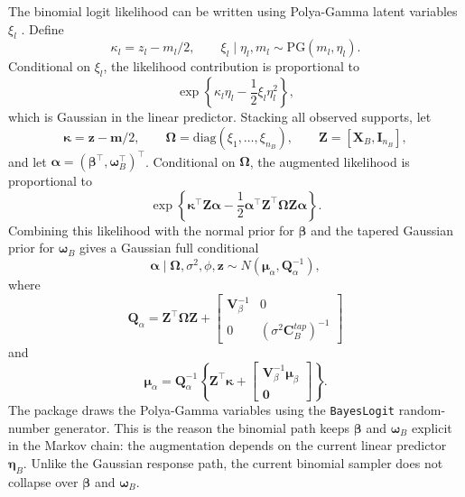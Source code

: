 \documentclass[11pt]{article}
\newcommand{\bbeta}{\bm{\beta}}
\newcommand{\bw}{\bm{\omega}}
\newcommand{\bzero}{\bm{0}}
\newcommand{\bI}{\bm{I}}
\newcommand{\bC}{\bm{C}}
\newcommand{\bV}{\bm{V}}
\newcommand{\bQ}{\bm{Q}}
\newcommand{\bX}{\bm{X}}
\newcommand{\bZ}{\bm{Z}}
\newcommand{\bz}{\bm{z}}
\newcommand{\bOmega}{\bm{\Omega}}
\newcommand{\trans}{^\top}
\begin{document}
The binomial logit likelihood can be written using Polya-Gamma latent
variables \(\xi_l\) \citep{PolsonScottWindle2013}. Define
\begin{equation}
  \kappa_l = z_l - m_l/2,
  \qquad
  \xi_l\mid \eta_l,m_l \sim \mathrm{PG}(m_l,\eta_l).
\end{equation}
Conditional on \(\xi_l\), the likelihood contribution is proportional to
\begin{equation}
  \exp\left\{\kappa_l\eta_l-\frac{1}{2}\xi_l\eta_l^2\right\},
\end{equation}
which is Gaussian in the linear predictor. Stacking all observed supports,
let
\[
  \bm{\kappa}=\bz-\bm{m}/2,
  \qquad
  \bOmega = \mathrm{diag}(\xi_1,\ldots,\xi_{n_B}),
  \qquad
  \bZ=[\bX_B,\bI_{n_B}],
\]
and let \(\bm{\alpha}=(\bbeta\trans,\bw_B\trans)\trans\). Conditional on
\(\bOmega\), the augmented likelihood is proportional to
\begin{equation}
  \exp\left\{
    \bm{\kappa}\trans\bZ\bm{\alpha}
    -\frac{1}{2}\bm{\alpha}\trans\bZ\trans\bOmega\bZ\bm{\alpha}
  \right\}.
\end{equation}
Combining this likelihood with the normal prior for \(\bbeta\) and the
tapered Gaussian prior for \(\bw_B\) gives a Gaussian full conditional
\begin{equation}
  \bm{\alpha}\mid \bOmega,\sigma^2,\phi,\bz
  \sim N(\bm{\mu}_\alpha,\bQ_\alpha^{-1}),
\end{equation}
where
\begin{equation}
  \bQ_\alpha =
  \bZ\trans\bOmega\bZ +
  \begin{bmatrix}
    \bV_\beta^{-1} & 0\\
    0 & (\sigma^2\bC_B^{tap})^{-1}
  \end{bmatrix}
\end{equation}
and
\begin{equation}
  \bm{\mu}_\alpha =
  \bQ_\alpha^{-1}
  \left\{
    \bZ\trans\bm{\kappa}+
    \begin{bmatrix}
      \bV_\beta^{-1}\bm{\mu}_\beta\\
      \bzero
    \end{bmatrix}
  \right\}.
\end{equation}
The package draws the Polya-Gamma variables using the \texttt{BayesLogit}
random-number generator. This is the reason the binomial path keeps
\(\bbeta\) and \(\bw_B\) explicit in the Markov chain: the
augmentation depends on the current linear predictor \(\bm{\eta}_B\). Unlike
the Gaussian response path, the current binomial sampler does not collapse
over \(\bbeta\) and \(\bw_B\).
\end{document}
